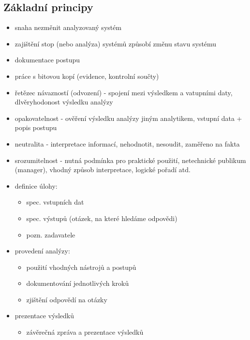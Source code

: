 \subsection{Základní principy}
\begin{itemize}
    \item snaha nezměnit analyzovaný systém
    \item zajištění stop (nebo analýza) systémů způsobí změnu stavu systému
    \item dokumentace postupu
    \item práce s bitovou kopí (evidence, kontrolní součty) \\
    \item řetězec návazností (odvození) - spojení mezi výsledkem a vatupními daty, dlvěryhodonost výsledku analýzy
    \item opakovatelnost - ověření výsledku analýzy jiným analytikem, vstupní data + popis postupu
    \item neutralita - interpretace informací, nehodnotit, nesoudit, zaměřeno na fakta
    \item srozumitelnost - nutná podmínka pro praktické použití, netechnické publikum (manager), vhodný způsob interpretace, logické pořadí atd. \\
    \item definice úlohy:
    \begin{itemize}
        \item spec. vstupních dat
        \item spec. výstupů (otázek, na které hledáme odpovědi)
        \item pozn. zadavatele
    \end{itemize}
    \item provedení analýzy:
    \begin{itemize}
        \item použití vhodných nástrojů a postupů
        \item dokumentování jednotlivých kroků
        \item zjištění odpovědí na otázky
    \end{itemize}
    \item prezentace výsledků
    \begin{itemize}
        \item závěrečná zpráva a prezentace výsledků
    \end{itemize}
\end{itemize}

